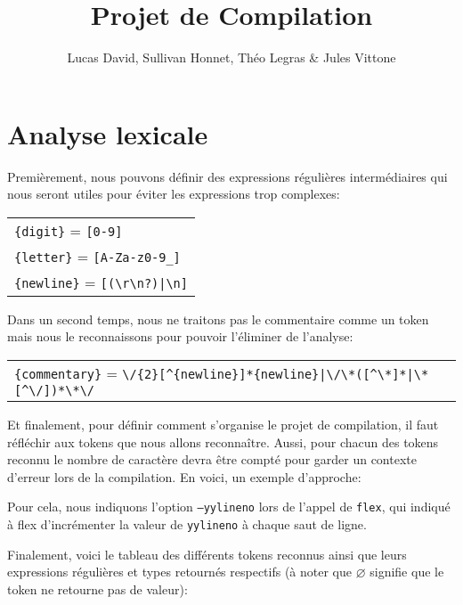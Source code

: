 \documentclass[12pt,a4paper]{article}
\begin{document}
\title{\bfseries Projet de Compilation}
\author{Lucas David, Sullivan Honnet, Théo Legras \& Jules Vittone}
\date{}
\maketitle

\part{Analyse lexicale}

Premièrement, nous pouvons définir des expressions régulières intermédiaires qui nous seront utiles pour éviter les expressions trop complexes:

\begin{tabular}{l}
    \verb!{digit}!   = \verb![0-9]!        \tabularnewline
    \verb!{letter}!  = \verb![A-Za-z0-9_]! \tabularnewline
    \verb!{newline}! = \verb![(\r\n?)|\n]! \tabularnewline
\end{tabular}

Dans un second temps, nous ne traitons pas le commentaire comme un token mais nous le reconnaissons pour pouvoir l'éliminer de l'analyse:

\begin{tabular}{l}
\verb!{commentary}! = \verb!\/{2}[^{newline}]*{newline}|\/\*([^\*]*|\*[^\/])*\*\/!
\end{tabular}


Et finalement, pour définir comment s'organise le projet de compilation, il faut réfléchir aux tokens que nous allons reconnaître. Aussi, pour chacun des tokens reconnu le nombre de caractère devra être compté pour garder un contexte d'erreur lors de la compilation. En voici, un exemple d'approche:

Pour cela, nous indiquons l'option \texttt{--yylineno} lors de l'appel de \texttt{flex}, qui indiqué à flex d'incrémenter la valeur de \texttt{yylineno} à chaque saut de ligne.

\newpage

Finalement, voici le tableau des différents tokens reconnus ainsi que leurs expressions régulières et types retournés respectifs (à noter que $\varnothing$ signifie que le token ne retourne pas de valeur):
\end{document}
